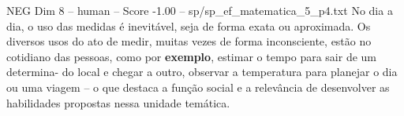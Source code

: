 \begin{textsample}{NEG Dim 8 – human – Score -1.00 – sp/sp\_ef\_matematica\_5\_p4.txt}  \label{ex:f8_neg_017}
No dia a dia, o uso das medidas é inevitável, seja de forma exata ou aproximada.
Os diversos usos do ato de medir, muitas vezes de forma inconsciente, estão no cotidiano das pessoas, como por \textbf{exemplo}, estimar o tempo para sair de um determina- do local e chegar a outro, observar a temperatura para planejar o dia ou uma viagem – o que destaca a função social e a relevância de desenvolver as habilidades propostas nessa unidade temática.

\end{textsample}
